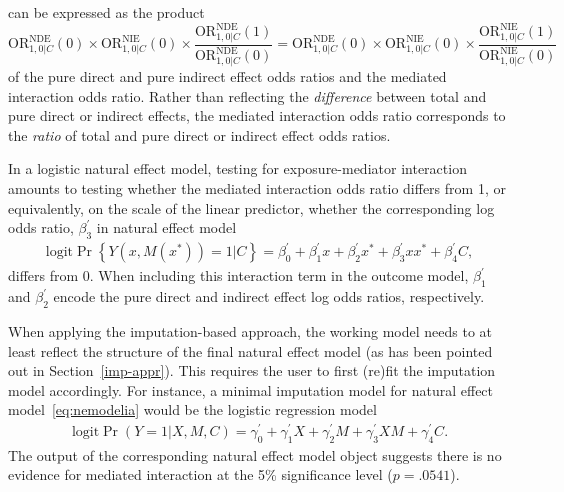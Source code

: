 \documentclass[nojss]{jss}
\begin{document}
can be expressed as the product $$\mbox{OR}^{\text{NDE}}_{1,0|C}(0) \times \mbox{OR}^{\text{NIE}}_{1,0|C}(0) \times \dfrac{\mbox{OR}^{\text{NDE}}_{1,0|C}(1)}{\mbox{OR}^{\text{NDE}}_{1,0|C}(0)} = \mbox{OR}^{\text{NDE}}_{1,0|C}(0) \times \mbox{OR}^{\text{NIE}}_{1,0|C}(0) \times \dfrac{\mbox{OR}^{\text{NIE}}_{1,0|C}(1)}{\mbox{OR}^{\text{NIE}}_{1,0|C}(0)}$$
of the pure direct and pure indirect effect odds ratios and the mediated interaction odds ratio.
Rather than reflecting the \emph{difference} between total and pure direct or indirect effects, the mediated interaction odds ratio corresponds to the \emph{ratio} of total and pure direct or indirect effect odds ratios.
\par In a logistic natural effect model, testing for exposure-mediator interaction amounts to testing whether the mediated interaction odds ratio differs from 1, or equivalently, on the scale of the linear predictor, whether the corresponding log odds ratio, $\beta_3^\prime$ in natural effect model
\begin{align}\label{eq:nemodelia}
\mbox{logit} \Pr\left\{Y(x,M(x^*))=1|C\right\} = \beta_0^\prime + \beta_1^\prime x + \beta_2^\prime x^* + \beta_3^\prime xx^* + \beta_4^\prime C,
\end{align}
differs from 0. When including this interaction term in the outcome model, $\beta_1^\prime$ and $\beta_2^\prime$ encode the pure direct and indirect effect log odds ratios, respectively.
\par When applying the imputation-based approach, the working model needs to at least reflect the structure of the final natural effect model (as has been pointed out in Section~\ref{imp-appr}). This requires the user to first (re)fit the imputation model accordingly. For instance, a minimal imputation model for natural effect model~\eqref{eq:nemodelia} would be the logistic regression model
\begin{align*}
\mbox{logit} \Pr(Y=1|X,M,C) = \gamma_0^\prime + \gamma_1^\prime X + \gamma_2^\prime M + \gamma_3^\prime XM + \gamma_4^\prime C.
\end{align*}
The output of the corresponding natural effect model object suggests there is no evidence for mediated interaction at the 5\% significance level ($p = .0541$).
\end{document}
